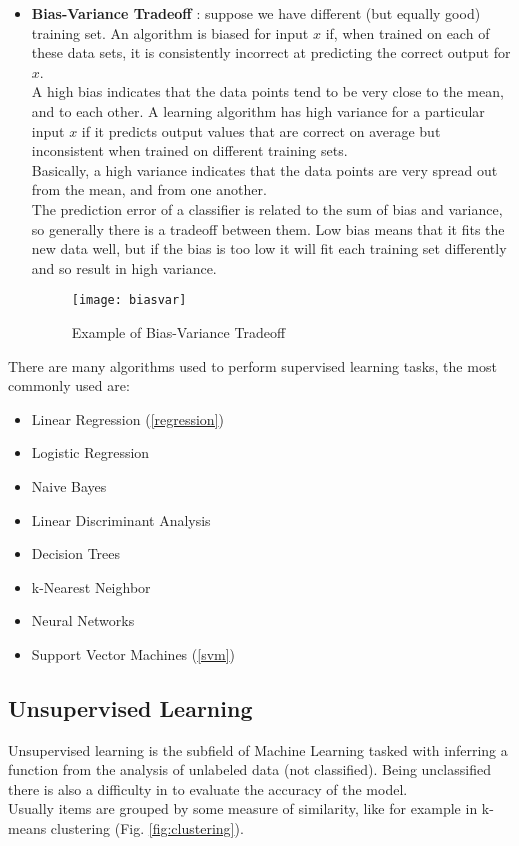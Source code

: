 \begin{itemize}
	\item \textbf{Bias-Variance Tradeoff} \cite{biasvar}: suppose we have different (but equally good) training set. An algorithm is biased for input $x$ if, when trained on each of these data sets, it is consistently incorrect at predicting the correct output for $x$. \\
	A high bias indicates that the data points tend to be very close to the mean, and to each other.
	A learning algorithm has high variance for a particular input $x$ if it predicts output values that are correct on average but inconsistent when trained on different training sets. \\
	Basically, a high variance indicates that the data points are very spread out from the mean, and from one another.\\
	The prediction error of a classifier is related to the sum of bias and variance, so generally there is a tradeoff between them. Low bias means that it fits the new data well, but if the bias is too low it will fit each training set differently and so result in high variance.\\
	\begin{figure}[H]
		\centering
		\texttt{[image: biasvar]}
		\caption{Example of Bias-Variance Tradeoff \cite{biasvarTradeoff}}
		\label{fig:biasvar}
	\end{figure}	
\end{itemize}

There are many algorithms used to perform supervised learning tasks, the most commonly used are: \\
\begin{itemize}[noitemsep, topsep = -5pt]
	\item Linear Regression (\ref{regression})
	\item Logistic Regression
	\item Naive Bayes
	\item Linear Discriminant Analysis
	\item Decision Trees
	\item k-Nearest Neighbor
	\item Neural Networks
	\item Support Vector Machines (\ref{svm})
\end{itemize}


\subsection{Unsupervised Learning} \label{unsupervised}
Unsupervised learning is the subfield of Machine Learning tasked with inferring a function from the analysis of unlabeled data (not classified). Being unclassified there is also a difficulty in to evaluate the accuracy of the model.\\
Usually items are grouped by some measure of similarity, like for example in k-means clustering (Fig. \ref{fig:clustering}).

